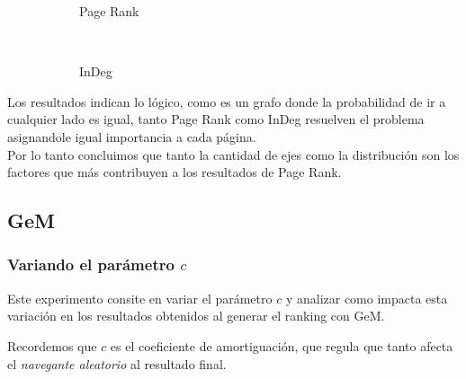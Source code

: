 \begin{figure}[H]
    \centering
    \begin{subfigure}[t]{0.5\textwidth}
      \begin{center}
        Page Rank\\
      \end{center}
    \end{subfigure}%
    ~
    \begin{subfigure}[t]{0.5\textwidth}
      \begin{center}
        InDeg\\
      \end{center}
    \end{subfigure}
\end{figure}

Los resultados indican lo lógico, como es un grafo donde la probabilidad de ir a cualquier lado es igual, tanto Page Rank como InDeg resuelven el problema asignandole igual importancia a cada página.\\
Por lo tanto concluimos que tanto la cantidad de ejes como la distribución son los factores que más contribuyen a los resultados de Page Rank.

\subsection{GeM}

\subsubsection{Variando el parámetro $c$}\label{exp_gem_2}
Este experimento consite en variar el parámetro $c$ y analizar como impacta esta
variación en los resultados obtenidos al generar el ranking con GeM.

Recordemos que $c$ es el coeficiente de amortiguación, que regula que tanto afecta
el \textit{navegante aleatorio} al resultado final.

